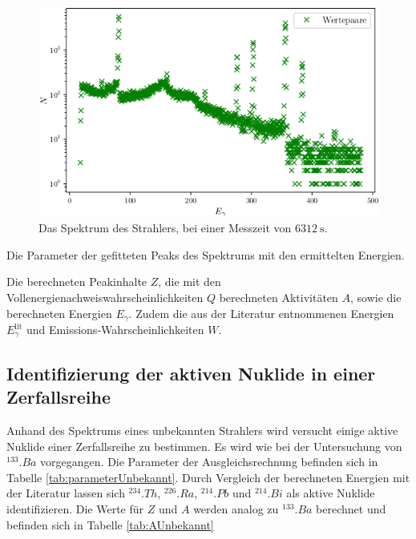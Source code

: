 \begin{figure}
	\centering
	\includegraphics[width=\linewidth-70pt,height=\textheight-70pt,keepaspectratio]{content/images/D.png}
	\caption{Das Spektrum des Strahlers, bei einer Messzeit von $\SI{6312}{\second}$.}
	\label{fig:Ba}
\end{figure}

\begin{table}
	\centering
	\caption{Die Parameter der gefitteten Peaks des Spektrums mit den ermittelten Energien.}
	
	\label{tab:parameterBa}
\end{table}

\begin{table}
	\centering
	\caption{Die berechneten Peakinhalte $Z$, die mit den Vollenergienachweiswahrscheinlichkeiten $Q$ berechneten Aktivitäten $A$,  sowie die berechneten Energien $E_\gamma$.  Zudem die aus der Literatur entnommenen Energien $E_\gamma^\text{lit}$ und Emissions-Wahrscheinlichkeiten $W$.}
	
	\label{tab:ABa}
\end{table}

\subsection{Identifizierung der aktiven Nuklide in einer Zerfallsreihe}

Anhand des Spektrums eines unbekannten Strahlers wird versucht einige aktive Nuklide einer Zerfallsreihe zu bestimmen. Es wird wie bei der Untersuchung von $^{133}.{Ba}$ vorgegangen. Die Parameter der Ausgleichsrechnung befinden sich in Tabelle \ref{tab:parameterUnbekannt}. Durch Vergleich der berechneten Energien mit der Literatur \cite{V18} lassen sich $^{234}.{Th}$, $^{226}.{Ra}$, $^{214}.{Pb}$ und $^{214}.{Bi}$ als aktive Nuklide identifizieren. Die Werte für $Z$ und $A$ werden analog zu $^{133}.{Ba}$ berechnet und befinden sich in Tabelle \ref{tab:AUnbekannt}

